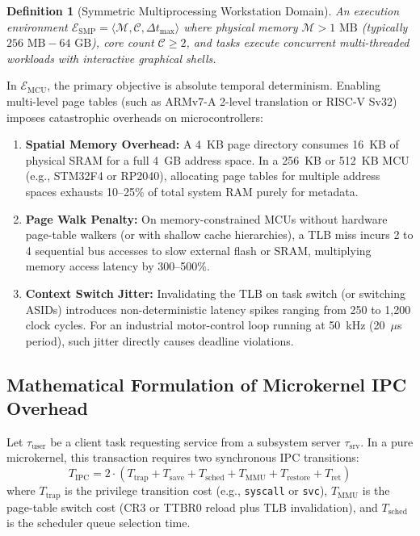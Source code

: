 \documentclass[10pt,journal,compsoc,twocolumn]{article}
\newtheorem{definition}{Definition}
\begin{document}
\begin{definition}[Symmetric Multiprocessing Workstation Domain]
An execution environment $\mathcal{E}_{\text{SMP}} = \langle \mathcal{M}, \mathcal{C}, \Delta t_{\max} \rangle$ where physical memory $\mathcal{M} > 1\text{ MB}$ (typically $256\text{ MB} - 64\text{ GB}$), core count $\mathcal{C} \ge 2$, and tasks execute concurrent multi-threaded workloads with interactive graphical shells.
\end{definition}

In $\mathcal{E}_{\text{MCU}}$, the primary objective is absolute temporal determinism. Enabling multi-level page tables (such as ARMv7-A 2-level translation or RISC-V Sv32) imposes catastrophic overheads on microcontrollers:
\begin{enumerate}[leftmargin=*]
    \item \textbf{Spatial Memory Overhead:} A 4~KB page directory consumes 16~KB of physical SRAM for a full 4~GB address space. In a 256~KB or 512~KB MCU (e.g., STM32F4 or RP2040), allocating page tables for multiple address spaces exhausts 10--25\% of total system RAM purely for metadata.
    \item \textbf{Page Walk Penalty:} On memory-constrained MCUs without hardware page-table walkers (or with shallow cache hierarchies), a TLB miss incurs 2 to 4 sequential bus accesses to slow external flash or SRAM, multiplying memory access latency by 300--500\%.
    \item \textbf{Context Switch Jitter:} Invalidating the TLB on task switch (or switching ASIDs) introduces non-deterministic latency spikes ranging from 250 to 1,200 clock cycles. For an industrial motor-control loop running at 50~kHz (20~$\mu$s period), such jitter directly causes deadline violations.
\end{enumerate}

\subsection{Mathematical Formulation of Microkernel IPC Overhead}
Let $\tau_{\text{user}}$ be a client task requesting service from a subsystem server $\tau_{\text{srv}}$. In a pure microkernel, this transaction requires two synchronous IPC transitions:
\begin{equation}
\label{eq:ipc_latency}
T_{\text{IPC}} = 2 \cdot \left( T_{\text{trap}} + T_{\text{save}} + T_{\text{sched}} + T_{\text{MMU}} + T_{\text{restore}} + T_{\text{ret}} \right)
\end{equation}
where $T_{\text{trap}}$ is the privilege transition cost (e.g., \texttt{syscall} or \texttt{svc}), $T_{\text{MMU}}$ is the page-table switch cost ($\text{CR3}$ or TTBR0 reload plus TLB invalidation), and $T_{\text{sched}}$ is the scheduler queue selection time.
\end{document}
